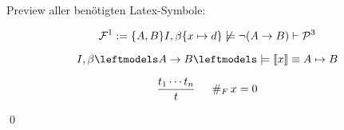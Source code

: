 

\date{Donnerstag 07.11.2019}


\maketitle
\thispagestyle{fancy}


Preview aller benötigten Latex-Symbole:

$$ \mathcal{F}^{1} := \{ A, B\}  I, \beta \{x \mapsto d\} \not\models \lnot(A \to B) \vdash \mathcal{P}^{3} $$

$$ \Ib \lmodels A \to B\bimodels \llbracket x \rrbracket \equiv A \mapsto B$$


$$ \frac{t_1\cdots t_n}{t} \,\,\,\,\,\,\,\,\,  \#_{F}\, x = 0 $$

\qed



